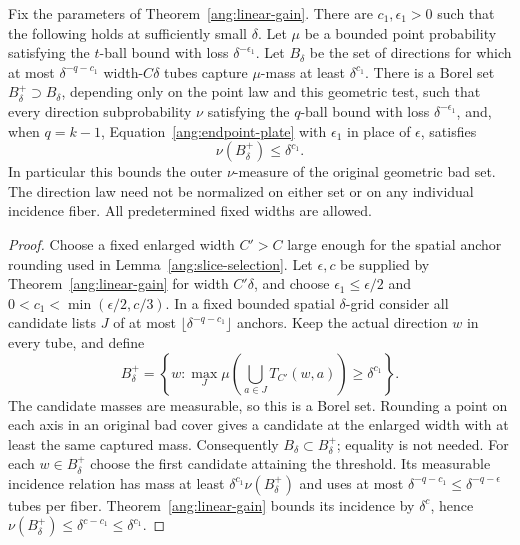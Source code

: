 \begin{corollary}\label{ang:bad-directions}
Fix the parameters of Theorem~\ref{ang:linear-gain}. There are
$c_1,\epsilon_1>0$ such that the following holds at sufficiently small
$\delta$. Let $\mu$ be a bounded point probability satisfying the
$t$-ball bound with loss $\delta^{-\epsilon_1}$. Let $B_\delta$
be the set of directions for which at most
$\delta^{-q-c_1}$ width-$C\delta$ tubes capture $\mu$-mass at
least $\delta^{c_1}$. There is a Borel set
$B_\delta^+\supset B_\delta$, depending only on the point law and this
geometric test, such that every direction subprobability $\nu$
satisfying the $q$-ball bound with loss $\delta^{-\epsilon_1}$,
and, when $q=k-1$, Equation~\eqref{ang:endpoint-plate} with
$\epsilon_1$ in place of $\epsilon$, satisfies
\[
 \nu(B_\delta^+)\le\delta^{c_1}.
\]
In particular this bounds the outer $\nu$-measure of the original
geometric bad set. The direction law need not be normalized on either
set or on any individual incidence fiber. All predetermined fixed
widths are allowed.
\end{corollary}

\begin{proof}
Choose a fixed enlarged width $C'>C$ large enough for the spatial
anchor rounding used in Lemma~\ref{ang:slice-selection}. Let
$\epsilon,c$ be supplied by Theorem~\ref{ang:linear-gain} for width
$C'\delta$, and choose $\epsilon_1\le\epsilon/2$ and
$0<c_1<\min(\epsilon/2,c/3)$. In a fixed bounded spatial
$\delta$-grid consider all candidate lists $J$ of at most
$\lfloor\delta^{-q-c_1}\rfloor$ anchors. Keep the actual direction
$w$ in every tube, and define
\[
 B_\delta^+
 =\left\{w:\max_J
       \mu\left(\bigcup_{a\in J}T_{C'}(w,a)\right)
                    \ge\delta^{c_1}\right\}.
\]
The candidate masses are measurable, so this is a Borel set.
Rounding a point on each axis in an original bad cover gives a
candidate at the enlarged width with at least the same captured mass.
Consequently $B_\delta\subset B_\delta^+$; equality is not needed.
For each $w\in B_\delta^+$ choose the first candidate attaining the
threshold. Its measurable incidence relation has mass at least
$\delta^{c_1}\nu(B_\delta^+)$ and uses at most
$\delta^{-q-c_1}\le\delta^{-q-\epsilon}$ tubes per fiber.
Theorem~\ref{ang:linear-gain} bounds its incidence by $\delta^c$, hence
$\nu(B_\delta^+)\le\delta^{c-c_1}\le\delta^{c_1}$.
\end{proof}
